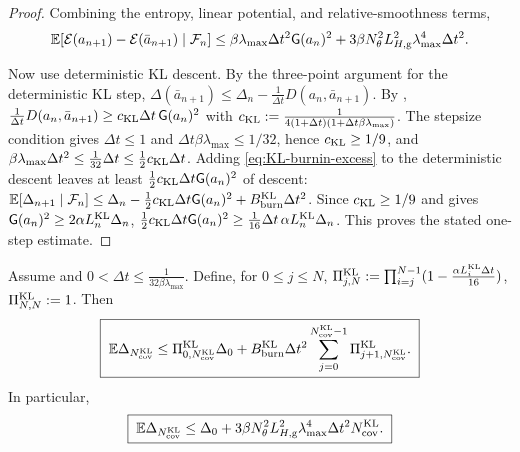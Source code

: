 \begin{proof}
Combining the entropy, linear potential, and relative-smoothness terms,
\begin{equation}
\label{eq:KL-burnin-excess}
    \mathbb{E}[\mathcal{E}(a_{n+1})-\mathcal{E}(\bar a_{n+1})\mid\mathcal{F}_n]
    \leq
    \beta\lambda_{\max}\Delta t^2\mathsf{G}(a_n)^2
    +
    3\beta N_\theta^2L_{H,\mathrm g}^2\lambda_{\max}^4\Delta t^2 .
\end{equation}

Now use deterministic KL descent. By the three-point argument for the deterministic KL step,
$\Delta(\bar a_{n+1})\leq\Delta_n-\tfrac1{\Delta t}D(a_n,\bar a_{n+1})$.
By ,
$\tfrac1{\Delta t}D(a_n,\bar a_{n+1})\geq c_{\mathrm{KL}}\Delta t\,\mathsf{G}(a_n)^2$ with
$c_{\mathrm{KL}}:=\tfrac1{4(1+\Delta t)(1+\Delta t\beta\lambda_{\max})}$.
The stepsize condition gives $\Delta t\leq1$ and $\Delta t\beta\lambda_{\max}\leq1/32$, hence
$c_{\mathrm{KL}}\geq1/9$, and $\beta\lambda_{\max}\Delta t^2\leq\tfrac1{32}\Delta t\leq\tfrac12 c_{\mathrm{KL}}\Delta t$.
Adding \eqref{eq:KL-burnin-excess} to the deterministic descent leaves at least
$\tfrac12c_{\mathrm{KL}}\Delta t\mathsf{G}(a_n)^2$ of descent:
$\mathbb{E}[\Delta_{n+1}\mid\mathcal{F}_n]\leq\Delta_n-\tfrac12c_{\mathrm{KL}}\Delta t\mathsf{G}(a_n)^2+B_{\mathrm{burn}}^{\mathrm{KL}}\Delta t^2$.
Since $c_{\mathrm{KL}}\geq1/9$ and  gives $\mathsf{G}(a_n)^2\geq2\alpha L_n^{\mathrm{KL}}\Delta_n$,
$\tfrac12c_{\mathrm{KL}}\Delta t\mathsf{G}(a_n)^2\geq\tfrac1{16}\Delta t\,\alpha L_n^{\mathrm{KL}}\Delta_n$.
This proves the stated one-step estimate.
\end{proof}

\begin{theorem}
\label{thm:KL-STL-burnin-energy}
Assume  and
$0<\Delta t\leq\frac1{32\beta\lambda_{\max}}$.
Define, for $0\leq j\leq N$,
$\Pi_{j,N}^{\mathrm{KL}}:=\prod_{i=j}^{N-1}(1-\tfrac{\alpha L_i^{\mathrm{KL}}\Delta t}{16})$, $\Pi_{N,N}^{\mathrm{KL}}:=1$.
Then
\begin{equation}
\label{eq:KL-burnin-product}
    \boxed{\;
    \mathbb{E}\Delta_{N_{\mathrm{cov}}^{\mathrm{KL}}}
    \leq
    \Pi_{0,N_{\mathrm{cov}}^{\mathrm{KL}}}^{\mathrm{KL}}\Delta_0
    +
    B_{\mathrm{burn}}^{\mathrm{KL}}\Delta t^2
    \sum_{j=0}^{N_{\mathrm{cov}}^{\mathrm{KL}}-1}
    \Pi_{j+1,N_{\mathrm{cov}}^{\mathrm{KL}}}^{\mathrm{KL}}.
    \;}
\end{equation}
In particular,
\begin{equation}
\label{eq:KL-burnin-simple}
    \boxed{\;
    \mathbb{E}\Delta_{N_{\mathrm{cov}}^{\mathrm{KL}}}
    \leq
    \Delta_0
    +
    3\beta N_\theta^2L_{H,\mathrm g}^2\lambda_{\max}^4\Delta t^2
    N_{\mathrm{cov}}^{\mathrm{KL}}.
    \;}
\end{equation}
\end{theorem}

